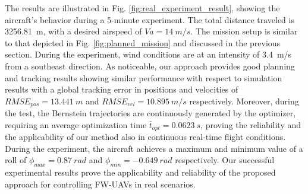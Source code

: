 The results are illustrated in Fig. \ref{fig:real_experiment_result}, showing the aircraft's behavior during a 5-minute experiment. The total distance traveled is 3256.81~\si{m}, with a desired airspeed of $Va = 14~\si{m/s}$. The mission setup is similar to that depicted in Fig. \ref{fig:planned_mission} and discussed in the previous section. During the experiment, wind conditions are at an intensity of 3.4~\si{m/s} from a southeast direction. 
As noticeable, our approach provides good planning and tracking results showing similar performance with respect to simulation results with a global tracking error in positions and velocities of $RMSE_{pos} = 13.441~\si{m}$ and $RMSE_{vel} = 10.895~\si{m/s}$ respectively.
Moreover, during the test, the Bernstein trajectories are continuously generated by the optimizer, requiring an average optimization time $\bar{t}_{opt} =  0.0623~\si{s}$, proving the reliability and the applicability of our method also in continuous real-time flight conditions. 
During the experiment, the aircraft achieves a maximum and minimum value of a roll of $\phi_{max} = 0.87~\si{rad}$ and $\phi_{min} = -0.649~\si{rad}$ respectively. Our successful experimental results prove the applicability and reliability of the proposed approach for controlling FW-UAVs in real scenarios.








